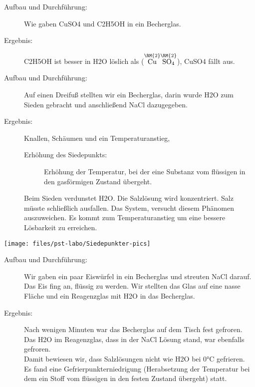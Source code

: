 \begin{description}
   \item[Aufbau und Durchführung:] Wie gaben \acl{CuSO4} und \acl{C2H5OH} in ein Becherglas.
   \item[Ergebnis:] \ac{C2H5OH} ist besser in \ac{H2O} löslich als  ($\mathrm{\stackrel{\RM{2}}{Cu}\stackrel{\RM{2}}{SO_4}}$), \ac{CuSO4} fällt aus.
\end{description}

\begin{description}
   \item[Aufbau und Durchführung:] Auf einen Dreifuß stellten wir ein Becherglas, darin wurde \ac{H2O} zum Sieden gebracht und anschließend \ac{NaCl} dazugegeben.
   \item[Ergebnis:] Knallen, Schäumen und ein Temperaturanstieg, \begin{description}\item[Erhöhung des Siedepunkts:] Erhöhung der Temperatur, bei der eine Substanz vom flüssigen in den gasförmigen Zustand übergeht.\end{description}
   Beim Sieden verdunstet \ac{H2O}. Die Salzlösung wird konzentriert. Salz müsste schließlich ausfallen. Das System, versucht diesem Phänomen auszuweichen. Es kommt zum Temperaturanstieg um eine bessere Lösbarkeit zu erreichen.
\end{description}
\begin{center}
   \texttt{[image: files/pst-labo/Siedepunkter-pics]}
\end{center}


\begin{description}
   \item[Aufbau und Durchführung:] Wir gaben ein paar Eiswürfel in ein Becherglas und streuten \ac{NaCl} darauf. Das Eis fing an, flüssig zu werden. Wir stellten das Glas auf eine nasse Fläche und ein Reagenzglas mit \ac{H2O} in das Becherglas.
   \item[Ergebnis:] Nach wenigen Minuten war das Becherglas auf dem Tisch fest gefroren. Das \ac{H2O} im Reagenzglas, dass in der \ac{NaCl} Lösung stand, war ebenfalls gefroren.\\
   Damit bewiesen wir, dass Salzlösungen nicht wie \ac{H2O} bei 0°C gefrieren.\\
Es fand eine Gefrierpunkterniedrigung (Herabsetzung der Temperatur bei dem ein Stoff vom flüssigen in den festen Zustand übergeht) statt.
\end{description}

